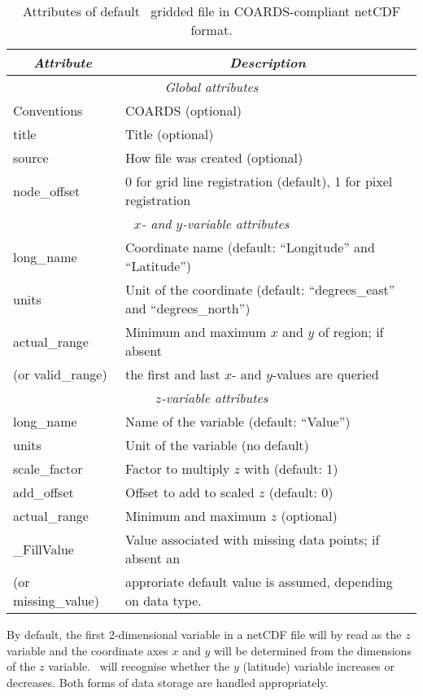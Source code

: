 \begin{table}
\centering
\begin{tabular}{|l|l|} \hline
\multicolumn{1}{|c}{\emph{Attribute}}   &       \multicolumn{1}{|c|}{\emph{Description}}        \\ \hline
\multicolumn{2}{|c|}{\emph{Global attributes}} \\ \hline
Conventions			& COARDS (optional) \\ \hline
title				& Title (optional) \\ \hline
source				& How file was created (optional) \\ \hline
node\_offset			& 0 for grid line registration (default), 1 for pixel registration \\ \hline
\multicolumn{2}{|c|}{\emph{$x$- and $y$-variable attributes}} \\ \hline
long\_name			& Coordinate name (default: ``Longitude'' and ``Latitude'') \\ \hline
units				& Unit of the coordinate (default: ``degrees\_east'' and ``degrees\_north'') \\ \hline
actual\_range			& Minimum and maximum $x$ and $y$ of region; if absent \\
(or valid\_range)		& the first and last $x$- and $y$-values are queried \\ \hline
\multicolumn{2}{|c|}{\emph{$z$-variable attributes}} \\ \hline
long\_name			& Name of the variable (default: ``Value'') \\ \hline
units				& Unit of the variable (no default) \\ \hline
scale\_factor			& Factor to multiply $z$ with (default: 1) \\ \hline
add\_offset			& Offset to add to scaled $z$ (default: 0) \\ \hline
actual\_range			& Minimum and maximum $z$ (optional) \\ \hline
\_FillValue			& Value associated with missing data points; if absent an\\
(or missing\_value)		& approriate default value is assumed, depending on data type. \\ \hline
\end{tabular} 
\caption{Attributes of default \gmt\ gridded file in COARDS-compliant netCDF format.}
\label{tbl:netcdf-format}
\end{table}

By default, the first 2-dimensional variable in a netCDF file will by read as the $z$ variable
and the coordinate axes $x$ and $y$ will be determined from the dimensions of the $z$ variable.
\GMT\ will recognise whether the $y$ (latitude) variable increases or decreases. Both forms of
data storage are handled appropriately.

